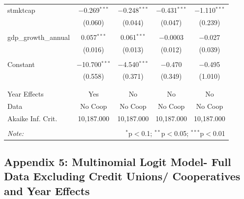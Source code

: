 \documentclass[a4paper, nobind]{templates/ociamthesis}
\begin{document}
\begin{table}[!htbp]
\begin{tabular}{@{\extracolsep{5pt}}lcccc}
 stmktcap & $-$0.269$^{***}$ & $-$0.248$^{***}$ & $-$0.431$^{***}$ & $-$1.110$^{***}$ \\ 
  & (0.060) & (0.044) & (0.047) & (0.239) \\ 
  & & & & \\ 
 gdp\_growth\_annual & 0.057$^{***}$ & 0.061$^{***}$ & $-$0.0003 & $-$0.027 \\ 
  & (0.016) & (0.013) & (0.012) & (0.039) \\ 
  & & & & \\ 
 Constant & $-$10.700$^{***}$ & $-$4.540$^{***}$ & $-$0.470 & $-$0.495 \\ 
  & (0.558) & (0.371) & (0.349) & (1.010) \\ 
  & & & & \\ 
\hline \\[-1.8ex] 
Year Effects & Yes & No & No & No \\ 
Data & No Coop & No Coop & No Coop & No Coop \\ 
Akaike Inf. Crit. & 10,187.000 & 10,187.000 & 10,187.000 & 10,187.000 \\ 
\hline 
\hline \\[-1.8ex] 
\textit{Note:}  & \multicolumn{4}{r}{$^{*}$p$<$0.1; $^{**}$p$<$0.05; $^{***}$p$<$0.01} \\ 
\end{tabular} 
\end{table}

\newpage

\hypertarget{appendix-5-multinomial-logit-model--full-data-excluding-credit-unions-cooperatives-and-year-effects}{%
\subsection{Appendix 5: Multinomial Logit Model- Full Data Excluding Credit Unions/ Cooperatives and Year Effects}\label{appendix-5-multinomial-logit-model--full-data-excluding-credit-unions-cooperatives-and-year-effects}}
\end{document}
